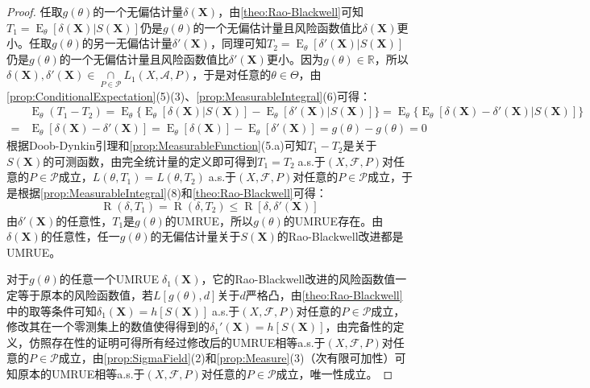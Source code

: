 \begin{proof}
	任取$g(\theta)$的一个无偏估计量$\delta(\mathbf{X})$，由\cref{theo:Rao-Blackwell}可知$T_1=\operatorname{E}_{\theta}[\delta(\mathbf{X})|S(\mathbf{X})]$仍是$g(\theta)$的一个无偏估计量且风险函数值比$\delta(\mathbf{X})$更小。任取$g(\theta)$的另一无偏估计量$\delta'(\mathbf{X})$，同理可知$T_2=\operatorname{E}_{\theta}[\delta'(\mathbf{X})|S(\mathbf{X})]$仍是$g(\theta)$的一个无偏估计量且风险函数值比$\delta'(\mathbf{X})$更小。因为$g(\theta)\in\mathbb{R}$，所以$\delta(\mathbf{X}),\delta'(\mathbf{X})\in\underset{P\in\mathscr{P}}{\cap}L_1(X,\mathscr{A},P)$，于是对任意的$\theta\in\Theta$，由\cref{prop:ConditionalExpectation}(5)(3)、\cref{prop:MeasurableIntegral}(6)可得：
	\begin{align*}
		&\operatorname{E}_{\theta}(T_1-T_2)=\operatorname{E}_{\theta}\{\operatorname{E}_{\theta}[\delta(\mathbf{X})|S(\mathbf{X})]-\operatorname{E}_{\theta}[\delta'(\mathbf{X})|S(\mathbf{X})]\}=\operatorname{E}_{\theta}\{\operatorname{E}_{\theta}[\delta(\mathbf{X})-\delta'(\mathbf{X})|S(\mathbf{X})]\} \\
		=&\operatorname{E}_{\theta}[\delta(\mathbf{X})-\delta'(\mathbf{X})]=\operatorname{E}_{\theta}[\delta(\mathbf{X})]-\operatorname{E}_{\theta}[\delta'(\mathbf{X})]=g(\theta)-g(\theta)=0
	\end{align*}
	根据Doob-Dynkin引理和\cref{prop:MeasurableFunction}(5.a)可知$T_1-T_2$是关于$S(\mathbf{X})$的可测函数，由完全统计量的定义即可得到$T_1=T_2\;$a.s.于$(X,\mathscr{F},P)$对任意的$P\in\mathscr{P}$成立，$L(\theta,T_1)=L(\theta,T_2)\;$a.s.于$(X,\mathscr{F},P)$对任意的$P\in\mathscr{P}$成立，于是根据\cref{prop:MeasurableIntegral}(8)和\cref{theo:Rao-Blackwell}可得：
	\begin{equation*}
		\operatorname{R}(\delta,T_1)=\operatorname{R}(\delta,T_2)\leqslant\operatorname{R}[\delta,\delta'(\mathbf{X})]
	\end{equation*}
	由$\delta'(\mathbf{X})$的任意性，$T_1$是$g(\theta)$的UMRUE，所以$g(\theta)$的UMRUE存在。由$\delta(\mathbf{X})$的任意性，任一$g(\theta)$的无偏估计量关于$S(\mathbf{X})$的Rao-Blackwell改进都是UMRUE。\par
	对于$g(\theta)$的任意一个UMRUE$\;\delta_1(\mathbf{X})$，它的Rao-Blackwell改进的风险函数值一定等于原本的风险函数值，若$L[g(\theta),d]$关于$d$严格凸，由\cref{theo:Rao-Blackwell}中的取等条件可知$\delta_1(\mathbf{X})=h[S(\mathbf{X})]\;$a.s.于$(X,\mathscr{F},P)$对任意的$P\in\mathscr{P}$成立，修改其在一个零测集上的数值使得得到的$\delta_1'(\mathbf{X})=h[S(\mathbf{X})]$，由完备性的定义，仿照存在性的证明可得所有经过修改后的UMRUE相等a.s.于$(X,\mathscr{F},P)$对任意的$P\in\mathscr{P}$成立，由\cref{prop:SigmaField}(2)和\cref{prop:Measure}(3)（次有限可加性）可知原本的UMRUE相等a.s.于$(X,\mathscr{F},P)$对任意的$P\in\mathscr{P}$成立，唯一性成立。
\end{proof}
